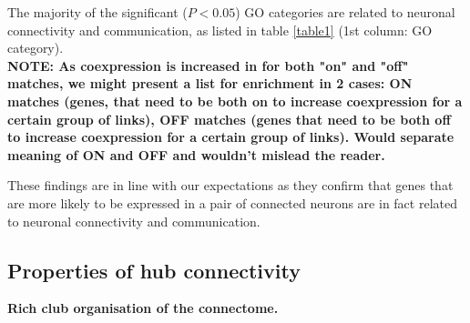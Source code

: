 \documentclass[10pt,letterpaper]{article}
\begin{document}

The majority of the significant ($P < 0.05$) GO categories are related to neuronal connectivity and communication, as listed in table \ref{table1} (1st column: GO category).\\
\textbf{NOTE: As coexpression is increased in for both "on" and "off" matches, we might present a list for enrichment in 2 cases: ON matches (genes, that need to be both on to increase coexpression for a certain group of links), OFF matches (genes that need to be both off to increase coexpression for a certain group of links). 
Would separate meaning of ON and OFF and wouldn't mislead the reader. }



These findings are in line with our expectations as they confirm that genes that are more likely to be expressed in a pair of connected neurons are in fact related to neuronal connectivity and communication.


\subsection*{Properties of hub connectivity}
\textbf{Rich club organisation of the connectome.}\\
\end{document}
